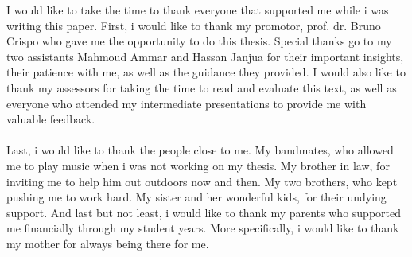 \documentclass[master=cws,masteroption=vs,english,extralanguage=dutch]{kulemt}
\begin{document}
	
\begin{preface} 
I would like to take the time to thank everyone that supported me while i was writing this paper. First, i would like to thank my promotor, prof. dr. Bruno Crispo who gave me the opportunity to do this thesis. Special thanks go to my two assistants Mahmoud Ammar and Hassan Janjua for their important insights, their patience with me, as well as the guidance they provided. I would also like to thank my assessors for taking the time to read and evaluate this text, as well as everyone who attended my intermediate presentations to provide me with valuable feedback. \\ \\ Last, i would like to thank the people close to me. My bandmates, who allowed me to play music when i was not working on my thesis. My brother in law, for inviting me to help him out outdoors now and then. My two brothers, who kept pushing me to work hard. My sister and her wonderful kids, for their undying support. And last but not least, i would like to thank my parents who supported me financially through my student years. More specifically, i would like to thank my mother for always being there for me.     
\end{preface}
	
\tableofcontents*
\end{document}
